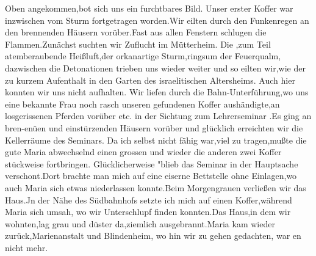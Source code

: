 \documentclass[a4paper,11pt]{article}
\begin{document}
Oben angekommen,bot sich uns ein furchtbares Bild. Unser erster Koffer war inzwischen vom Sturm fortgetragen worden.Wir eilten durch den Funkenregen an den brennenden Häusern vorüber.Fast aus allen Fenstern schlugen die Flammen.Zunächst suchten wir Zuflucht im Mütterheim. Die ,zum Teil atemberaubende Heißluft,der orkanartige Sturm,ringsum der Feuerqualm, dazwischen die Detonationen trieben uns wieder weiter und so eilten wir,wie der zu kurzem Aufenthalt in den Garten des israelitischen Altersheims. Auch hier konnten wir uns nicht aufhalten. Wir liefen durch die Bahn-Unterführung,wo uns eine bekannte Frau noch rasch unseren gefundenen Koffer aushändigte,an losgerissenen Pferden vorüber etc. in der Sichtung zum Lehrerseminar .Es ging an bren-enüen und einstürzenden Häusern vorüber und glücklich erreichten wir die Kellerräume des Seminars. Da ich selbst nicht fähig war,viel zu tragen,mußte die gute Maria abwechselnd einen grossen und wieder die anderen zwei Koffer stückweise fortbringen. Glücklicherweise "blieb das Seminar in der Hauptsache verschont.Dort brachte man mich auf eine eiserne Bettstelle ohne Einlagen,wo auch Maria sich etwas niederlassen konnte.Beim Morgengrauen verließen wir das Haus.Jn der Nähe des Südbahnhofs setzte ich mich auf einen Koffer,während Maria sich umsah, wo wir Unterschlupf finden konnten.Das Haus,in dem wir wohnten,lag grau und düster da,ziemlich ausgebrannt.Maria kam wieder zurück,Marienanstalt und Blindenheim, wo hin wir zu gehen gedachten, war en nicht mehr.
\end{document}
